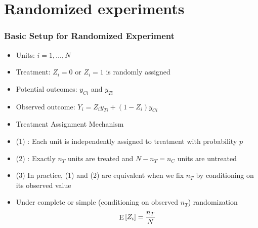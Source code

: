 \documentclass[table, xcolor = {dvipsnames}, 9pt]{beamer}
\theoremstyle{plain}
\newcommand{\mh}[1]{{\color{magenta}{#1}}}
\DeclareMathOperator{\E}{\rm{E}}
\begin{document}
\section{Randomized experiments}
\begin{frame}
  \frametitle{Basic Setup for Randomized Experiment}
  \begin{itemize}
  \item Units: $i = 1, \ldots, N $
  \item Treatment: $Z_i = 0$ or $Z_i = 1$ is randomly assigned     
  \item Potential outcomes: $y_{Ci}$ and $y_{Ti}$
  \item Observed outcome: $Y_i = Z_i y_{Ti} + (1 - Z_i) y_{Ci}$
    \vspace{0.1in} \pause
  \item Treatment Assignment Mechanism
  \item[] (1) \mh{Bernoulli (simple) randomization}: Each unit is
    independently assigned to treatment with probability $p$
  \item[] (2) \mh{Complete randomization}: Exactly $n_T$ units are treated and $N - n_T = n_C$ units are untreated
  \item[] (3) In practice, (1) and (2) are equivalent when we fix $n_T$ by conditioning on its observed value
    \vspace{0.1in}
  \item Under complete or simple (conditioning on observed $n_T$) randomization
$$
\E\left[Z_i\right] = \dfrac{n_T}{N}
$$
  \end{itemize}
\end{frame}
\end{document}
